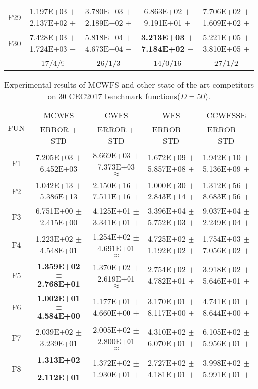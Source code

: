 \documentclass[paper]{ieice}
\begin{document}
\begin{table*}[htbp]
\begin{tabular}{c|c|c|c|c}
		F29	&	1.197E+03	$\pm$	2.137E+02	$+$	&	3.780E+03	$\pm$	2.189E+02	$+$	&	6.863E+02	$\pm$	9.191E+01	$+$	&	7.706E+02	$\pm$	1.609E+02	$+$	\\
		F30	&	7.428E+03	$\pm$	1.724E+03	$-$	&	5.818E+04	$\pm$	4.673E+04	$-$	&	\textbf{3.213E+03	$\pm$	7.184E+02}	$-$	&	5.221E+05	$\pm$	3.810E+05	$+$	\\  \hline
		&	17/4/9				&	26/1/3				&	14/0/16				&	27/1/2				\\ \hline   
	\end{tabular}
\end{table*}



\begin{table*}[htbp]  
	\caption{Experimental results of MCWFS and other state-of-the-art competitors on 30 CEC2017 benchmark functions($D = 50$).}  \label{cec2017d50}
	\centering
	\begin{tabular}{c|c|c|c|c}
		\hline
		\multirow{2}{*}{FUN}	&	MCWFS				&	CWFS				&	WFS				&	CCWFSSE				\\   \cline{2-5}
		&	ERROR	$\pm$	STD		&	ERROR	$\pm$	STD		&	ERROR	$\pm$	STD		&	ERROR	$\pm$	STD		\\ \hline
		F1	&	7.205E+03	$\pm$	6.452E+03		&	8.669E+03	$\pm$	7.373E+03	$\approx$	&	1.672E+09	$\pm$	5.857E+08	$+$	&	1.942E+10	$\pm$	5.136E+09	$+$	\\
		F2	&	1.042E+13	$\pm$	5.386E+13		&	2.150E+16	$\pm$	7.511E+16	$+$	&	1.000E+30	$\pm$	2.843E+14	$+$	&	1.312E+56	$\pm$	8.683E+56	$+$	\\
		F3	&	6.751E+00	$\pm$	2.415E+00		&	4.125E+01	$\pm$	3.341E+01	$+$	&	3.396E+04	$\pm$	5.752E+03	$+$	&	9.037E+04	$\pm$	2.249E+04	$+$	\\
		F4	&	1.223E+02	$\pm$	4.548E+01		&	1.254E+02	$\pm$	4.691E+01	$\approx$	&	4.725E+02	$\pm$	1.192E+02	$+$	&	1.754E+03	$\pm$	7.056E+02	$+$	\\
		F5	&	\textbf{1.359E+02	$\pm$	2.768E+01}		&	1.370E+02	$\pm$	2.619E+01	$\approx$	&	2.754E+02	$\pm$	4.782E+01	$+$	&	3.918E+02	$\pm$	5.646E+01	$+$	\\
		F6	&	\textbf{1.002E+01	$\pm$	4.584E+00}		&	1.177E+01	$\pm$	4.660E+00	$+$	&	3.170E+01	$\pm$	8.117E+00	$+$	&	4.741E+01	$\pm$	8.644E+00	$+$	\\
		F7	&	2.039E+02	$\pm$	3.239E+01		&	2.005E+02	$\pm$	2.800E+01	$\approx$	&	4.310E+02	$\pm$	6.070E+01	$+$	&	6.105E+02	$\pm$	5.956E+01	$+$	\\
		F8	&	\textbf{1.313E+02	$\pm$	2.112E+01}		&	1.372E+02	$\pm$	1.930E+01	$+$	&	2.727E+02	$\pm$	4.181E+01	$+$	&	3.998E+02	$\pm$	5.991E+01	$+$	\\

\end{tabular}
\end{table*}
\end{document}
